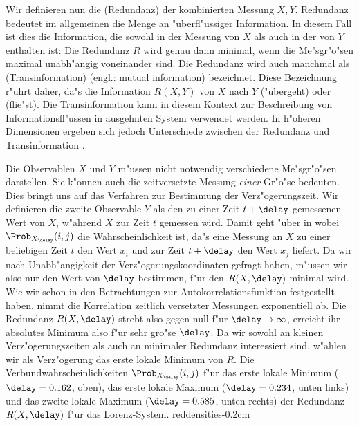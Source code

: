 Wir definieren nun die \begriff(Redundanz) der kombinierten Messung $X,Y$. Redundanz
bedeutet im allgemeinen die Menge an "uberfl"ussiger Information. In diesem Fall ist dies die
Information, die sowohl in der Messung von $X$ als auch in der von $Y$ enthalten ist:
 Die Redundanz $R$ wird genau dann minimal,
wenn die Me"sgr"o"sen maximal unabh"angig voneinander sind. Die Redundanz wird auch
manchmal als \begriff(Transinformation) (engl.: mutual information) bezeichnet. Diese
Bezeichnung r"uhrt daher, da"s die Information $R(X,Y)$ von $X$ nach $Y$ \slang("ubergeht)
oder \slang(flie"st). Die Transinformation kann in diesem Kontext zur Beschreibung von
Informationsfl"ussen in ausgehnten System verwendet werden\cite{Pawelzik91}.  In h"oheren
Dimensionen ergeben sich jedoch Unterschiede zwischen der Redundanz und Transinformation
\cite{Prichard95}.



Die Observablen $X$ und $Y$ m"ussen nicht notwendig verschiedene Me"sgr"o"sen darstellen.
Sie k"onnen auch die zeitversetzte Messung \emph{einer} Gr"o"se bedeuten.  Dies bringt uns
auf das Verfahren zur Bestimmung der Verz"ogerungszeit.  Wir definieren die zweite
Observable $Y$ als den zu einer Zeit $t+\delay$ gemessenen Wert von $X$, w"ahrend $X$ zur
Zeit $t$ gemessen wird. Damit geht  "uber in
wobei $\Prob_{X_\delay}(i,j)$ die Wahrscheinlichkeit ist, da"s
eine Messung an $X$ zu einer beliebigen Zeit $t$ den Wert $x_i$ und zur Zeit $t+\delay$
den Wert $x_j$ liefert.  Da wir nach
Unabh"angigkeit der Verz"ogerungskoordinaten gefragt haben, m"ussen wir also nur den Wert
von $\delay$ bestimmen, f"ur den $R(X,\delay)$ minimal wird. Wie wir schon in den
Betrachtungen zur Autokorrelationsfunktion festgestellt haben, nimmt die Korrelation
zeitlich versetzter Messungen exponentiell ab. Die Redundanz $R(X,\delay)$ strebt also
gegen null f"ur $\delay\to\infty$, erreicht ihr absolutes Minimum also f"ur sehr gro"se $\delay$. Da
wir sowohl an kleinen Verz"ogerungszeiten als auch an minimaler Redundanz interessiert
sind, w"ahlen wir als Verz"ogerung das erste lokale Minimum von $R$.
 {Die
  Verbundwahrscheinlichkeiten $\Prob_{X_\delay}(i,j)$ f"ur das erste lokale Minimum
  ($\delay=0.162$, oben), das erste lokale Maximum ($\delay=0.234$, unten links) und das
  zweite lokale Maximum ($\delay=0.585$, unten rechts) der Redundanz $R(X,\delay)$ f"ur
  das Lorenz-System.
}{reddensities}{-0.2cm}

